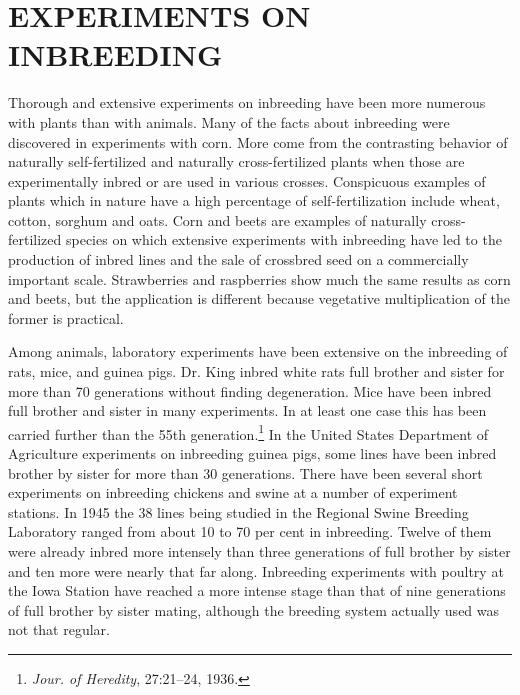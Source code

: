 \section*{EXPERIMENTS ON INBREEDING}

Thorough and extensive experiments on inbreeding have been
more numerous with plants than with animals. Many of the facts
about inbreeding were discovered in experiments with corn. More come
from the contrasting behavior of naturally self-fertilized and naturally
cross-fertilized plants when those are experimentally inbred or are used
in various crosses. Conspicuous examples of plants which in nature
have a high percentage of self-fertilization include wheat, cotton, sorghum
and oats. Corn and beets are examples of naturally cross-fertilized
species on which extensive experiments with inbreeding have led to the
production of inbred lines and the sale of crossbred seed on a commercially
important scale. Strawberries and raspberries show much the
same results as corn and beets, but the application is different because
vegetative multiplication of the former is practical.

Among animals, laboratory experiments have been extensive on the
inbreeding of rats, mice, and guinea pigs. Dr. King inbred white rats
full brother and sister for more than 70 generations without finding
degeneration. Mice have been inbred full brother and sister in many
experiments. In at least one case this has been carried further than the
55th generation.\footnote{\textit{Jour. of Heredity}, 27:21--24, 1936.}
In the United States Department of Agriculture
experiments on inbreeding guinea pigs, some lines have been inbred
brother by sister for more than 30 generations. There have been several
short experiments on inbreeding chickens and swine at a number of
experiment stations. In 1945 the 38 lines being studied in the Regional
Swine Breeding Laboratory ranged from about 10 to 70 per cent in
inbreeding. Twelve of them were already inbred more intensely than
three generations of full brother by sister and ten more were nearly that
far along. Inbreeding experiments with poultry at the Iowa Station
have reached a more intense stage than that of nine generations of full
brother by sister mating, although the breeding system actually used
was not that regular.


